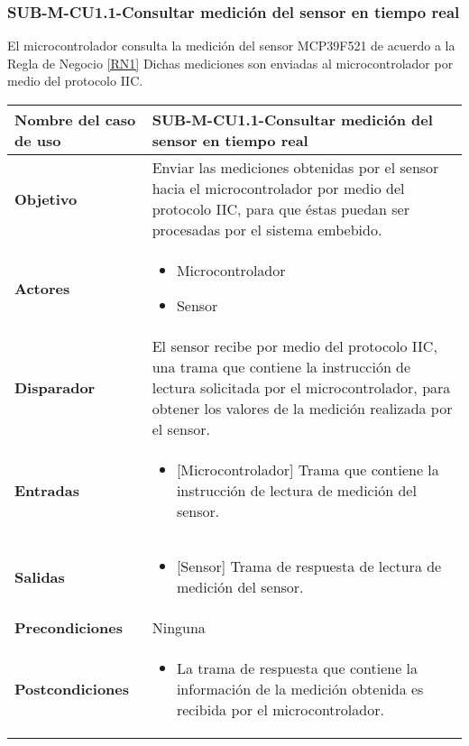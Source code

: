 \subsubsection{SUB-M-CU1.1-Consultar medición del sensor en tiempo real}\label{SUB-M-CU1.1}
El microcontrolador consulta la medición del sensor MCP39F521 de acuerdo a la Regla de Negocio \ref{RN1} Dichas mediciones son enviadas al microcontrolador por medio del protocolo IIC.
\begin{longtable}{|J{5cm}|J{10.3cm}|}
	\hline
	\textbf{Nombre del caso de uso} &
		SUB-M-CU1.1-Consultar medición del sensor en tiempo real \\ \hline
	\textbf{Objetivo} &
		Enviar las mediciones obtenidas por el sensor hacia el microcontrolador por medio del protocolo IIC, para que éstas puedan ser procesadas por el sistema embebido. \\ \hline
	\textbf{Actores} &
	    \begin{itemize}
		    \item Microcontrolador
		    \item Sensor
		\end{itemize}\\ \hline 
	\textbf{Disparador} & 
		El sensor recibe por medio del protocolo IIC, una trama que contiene la instrucción de lectura solicitada por el microcontrolador, para obtener los valores de la medición realizada por el sensor. \\ \hline 
	\textbf{Entradas} & 
		\begin{itemize}
				\item {[Microcontrolador]} Trama que contiene la instrucción de lectura de medición del sensor.
		\end{itemize}\\ \hline 
	\textbf{Salidas} & 
	    \begin{itemize}
	        \item {[Sensor]} Trama de respuesta de lectura de medición del sensor.
	    \end{itemize}\\ \hline
	\textbf{Precondiciones} & 
		Ninguna \\ \hline
	\textbf{Postcondiciones} &
		\begin{itemize}
			\item La trama de respuesta que contiene la información de la medición obtenida es recibida por el microcontrolador.

\end{itemize}
\end{longtable}

